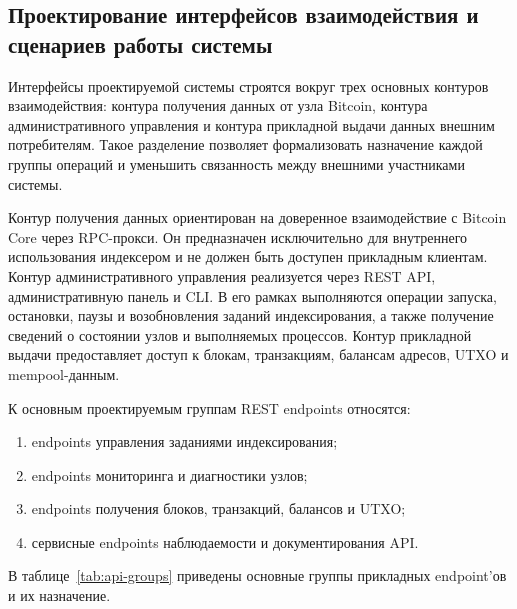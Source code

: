 \subsection{Проектирование интерфейсов взаимодействия и сценариев работы системы}

Интерфейсы проектируемой системы строятся вокруг трех основных контуров
взаимодействия: контура получения данных от узла Bitcoin, контура
административного управления и контура прикладной выдачи данных внешним
потребителям. Такое разделение позволяет формализовать назначение каждой группы
операций и уменьшить связанность между внешними участниками системы.

Контур получения данных ориентирован на доверенное взаимодействие с Bitcoin
Core через RPC-прокси. Он предназначен исключительно для внутреннего
использования индексером и не должен быть доступен прикладным клиентам. Контур
административного управления реализуется через REST API, административную
панель и CLI. В его рамках выполняются операции запуска, остановки, паузы и
возобновления заданий индексирования, а также получение сведений о состоянии узлов и
выполняемых процессов. Контур прикладной выдачи предоставляет доступ к блокам,
транзакциям, балансам адресов, UTXO и mempool-данным.

К основным проектируемым группам REST endpoints относятся:
\begin{enumerate}
    \item endpoints управления заданиями индексирования;
    \item endpoints мониторинга и диагностики узлов;
    \item endpoints получения блоков, транзакций, балансов и UTXO;
    \item сервисные endpoints наблюдаемости и документирования API.
\end{enumerate}

В таблице~\ref{tab:api-groups} приведены основные группы прикладных endpoint'ов
и их назначение.

